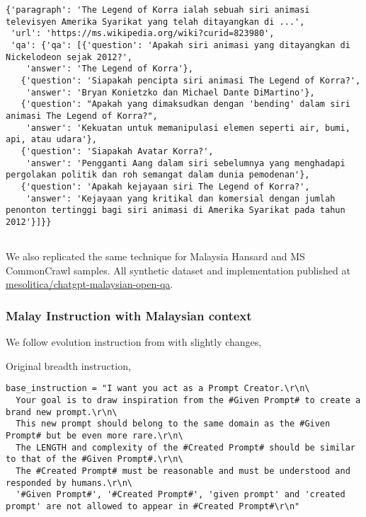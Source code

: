 \documentclass{article}
\begin{document}
\begin{lstlisting}[]
  {'paragraph': 'The Legend of Korra ialah sebuah siri animasi televisyen Amerika Syarikat yang telah ditayangkan di ...',
 'url': 'https://ms.wikipedia.org/wiki?curid=823980',
 'qa': {'qa': [{'question': 'Apakah siri animasi yang ditayangkan di Nickelodeon sejak 2012?',
    'answer': 'The Legend of Korra'},
   {'question': 'Siapakah pencipta siri animasi The Legend of Korra?',
    'answer': 'Bryan Konietzko dan Michael Dante DiMartino'},
   {'question': "Apakah yang dimaksudkan dengan 'bending' dalam siri animasi The Legend of Korra?",
    'answer': 'Kekuatan untuk memanipulasi elemen seperti air, bumi, api, atau udara'},
   {'question': 'Siapakah Avatar Korra?',
    'answer': 'Pengganti Aang dalam siri sebelumnya yang menghadapi pergolakan politik dan roh semangat dalam dunia pemodenan'},
   {'question': 'Apakah kejayaan siri The Legend of Korra?',
    'answer': 'Kejayaan yang kritikal dan komersial dengan jumlah penonton tertinggi bagi siri animasi di Amerika Syarikat pada tahun 2012'}]}}
    
\end{lstlisting}

We also replicated the same technique for Malaysia Hansard and MS CommonCrawl samples. All synthetic dataset and implementation published at \href{https://huggingface.co/datasets/mesolitica/chatgpt-malaysian-open-qa}{mesolitica/chatgpt-malaysian-open-qa}.

\pagebreak

\subsubsection{Malay Instruction with Malaysian context}

We follow evolution instruction from \cite{xu2023wizardlm} with slightly changes,

Original breadth instruction,

\begin{lstlisting}[]
  base_instruction = "I want you act as a Prompt Creator.\r\n\
  Your goal is to draw inspiration from the #Given Prompt# to create a brand new prompt.\r\n\
  This new prompt should belong to the same domain as the #Given Prompt# but be even more rare.\r\n\
  The LENGTH and complexity of the #Created Prompt# should be similar to that of the #Given Prompt#.\r\n\
  The #Created Prompt# must be reasonable and must be understood and responded by humans.\r\n\
  '#Given Prompt#', '#Created Prompt#', 'given prompt' and 'created prompt' are not allowed to appear in #Created Prompt#\r\n"
\end{lstlisting}
\end{document}
